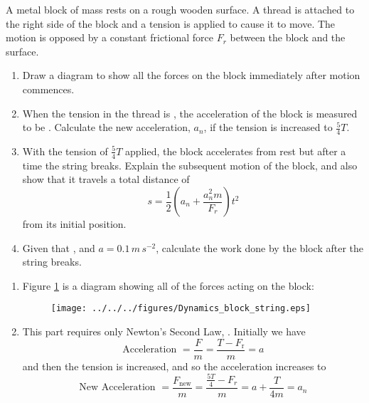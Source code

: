 
\begin{problem}[A1987PSIIQ9a] %
{A metal block of mass  rests on a rough wooden surface. A thread is attached to the right side of the block and a tension is applied to cause it to move. The motion is opposed by a constant frictional force $F_r$ between the block and the surface.
\begin{enumerate}
	\item Draw a diagram to show all the forces on the block immediately after motion commences.
	\item When the tension in the thread is , the acceleration of the block is measured to be . Calculate the new acceleration, $a_n$, if the tension is increased to $\frac{5}{4}T$.
	\item With the tension of $\frac{5}{4}T$ applied, the block accelerates from rest but after a time  the string breaks. Explain the subsequent motion of the block, and also show that it travels a total distance of 
	\begin{equation*} 
	s = \frac{1}{2} \left(a_{n} + \frac{a_{n}^{2}m}{F_{r}} \right)t^{2}
	\end{equation*} 
	from its initial position.
	\item Given that  ,  and $a=0.1\,m\,s^{-2}$, calculate the work done by the block after the string breaks.
\end{enumerate}
}
{}
{\begin{enumerate}
	\item Figure \ref{fig:Dynamics_block_string} is a diagram showing all of the forces acting on the block:
\begin{figure}[h]
\centering
\texttt{[image: ../../../figures/Dynamics\_block\_string.eps]}
\caption{}
\label{fig:Dynamics_block_string}
\end{figure}
	\item This part requires only Newton's Second Law, . Initially we have 
	\begin{equation*} 
	\text{Acceleration } = \frac{F}{m} = \frac{T - F_{\text{r}}}{m} = a 
	\end{equation*}
and then the tension is increased, and so the acceleration increases to
	\begin{equation*}
	 \text{New Acceleration } = \frac{F_{\text{new}}}{m} = \frac{\frac{5T}{4} - F_r}{m} = a + \frac{T}{4m} = a_{n} 
	 \end{equation*}
	

\end{enumerate}}
\end{problem}
